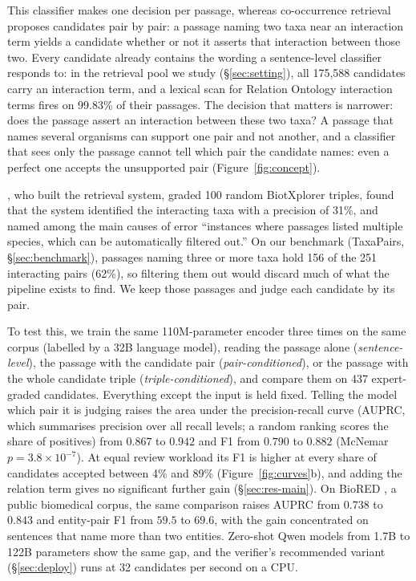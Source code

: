 \documentclass[11pt]{article}
\newcommand{\bench}{\mbox{TaxaPairs}}
\begin{document}
This classifier makes one decision per passage, whereas co-occurrence retrieval proposes candidates pair by pair: a
passage naming two taxa near an interaction term yields a candidate whether or not it asserts that
interaction between those two. Every candidate already contains the wording a sentence-level classifier responds to: in the retrieval pool we study
(\S\ref{sec:setting}), all 175{,}588 candidates carry an interaction term, and a lexical scan for
Relation Ontology interaction terms fires on 99.83\% of their passages. The decision that matters is narrower: does the passage assert an interaction between these two taxa? A passage that
names several organisms can support one pair and not another, and a classifier that sees only the
passage cannot tell which pair the candidate names: even a perfect one accepts the unsupported
pair (Figure~\ref{fig:concept}).

\citet{ruch2024biotxplorer}, who built the retrieval system, graded 100
random BiotXplorer triples, found that the system identified the interacting taxa with a
precision of 31\%, and named among the main causes of error ``instances where passages listed multiple
species, which can be automatically filtered out.'' On our benchmark (\bench{}, \S\ref{sec:benchmark}), passages naming three or more
taxa hold 156 of the 251 interacting pairs (62\%), so filtering them out would discard much of what
the pipeline exists to find. We keep those passages and judge each candidate by its pair.

To test this, we train the same 110M-parameter encoder three times on the same
corpus (labelled by a 32B language model), reading the passage alone (\emph{sentence-level}), the passage
with the candidate pair (\emph{pair-conditioned}), or the passage with the whole candidate triple
(\emph{triple-conditioned}), and compare them on 437 expert-graded candidates. Everything except the input is held fixed. Telling the model which pair it is judging raises the area under the
precision-recall curve (AUPRC, which summarises precision over all recall levels; a random ranking
scores the share of positives) from $0.867$ to $0.942$ and F1 from $0.790$ to $0.882$ (McNemar
$p = 3.8\times10^{-7}$). At equal review workload its F1 is higher at every share of candidates accepted between 4\% and 89\% (Figure~\ref{fig:curves}b), and adding the relation term
gives no significant further gain (\S\ref{sec:res-main}). On BioRED \citep{luo2022biored}, a public biomedical corpus, the same comparison raises
AUPRC from $0.738$ to $0.843$ and entity-pair F1 from $59.5$ to $69.6$, with the gain
concentrated on sentences that name more than two entities. Zero-shot Qwen models from 1.7B to 122B parameters show the same gap, and the verifier's recommended variant (\S\ref{sec:deploy}) runs
at 32 candidates per second on a CPU.
\end{document}
